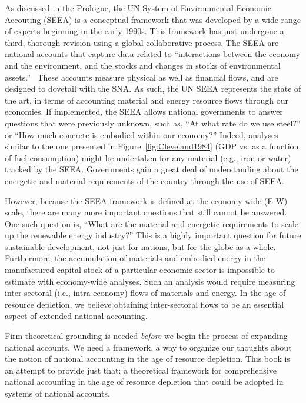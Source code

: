 %

As discussed in the Prologue, 
the UN System of Environmental-Economic Accouting (SEEA) 
is a conceptual framework 
that was developed by a wide range of experts 
beginning in the early 1990s. 
This framework has just undergone a third, 
thorough revision using a global collaborative process.
The SEEA are national accounts that
capture data related to ``interactions between the
economy and the environment, and the stocks
and changes in stocks of environmental assets.''~\cite[p. 1]{ UNSEEA2014}
These accounts measure physical as well as financial flows, and are
designed to dovetail with the SNA.
As such, the UN SEEA represents the state of the art,
in terms of accounting material and energy resource flows
through our economies.
If implemented, the SEEA allows national governments to answer questions
that were previously unknown,
such as, 
``At what rate do we use steel?'' or
``How much concrete is embodied within our economy?''
Indeed, analyses similar to the one presented in Figure~\ref{fig:Cleveland1984} 
(GDP vs. as a function of fuel consumption)
might be undertaken for any material (e.g., iron or water)
tracked by the SEEA.
Governments gain a great deal of understanding about the energetic
and material requirements of the country through the use of SEEA.

However, because the SEEA framework is defined at the economy-wide (E-W) scale,
there are many more important questions that still cannot be answered.
One such question is,
``What are the material and energetic requirements to scale up the renewable energy industry?''
This is a highly important question for future sustainable development,
not just for nations,
but for the globe as a whole.
Furthermore, the accumulation of materials and embodied energy
in the manufactured capital stock
of a particular economic sector is impossible to estimate with economy-wide analyses.
Such an analysis would require measuring inter-sectoral (i.e., intra-economy)
flows of materials and energy.
In the age of resource depletion, 
we believe obtaining inter-sectoral flows to be an essential
aspect of extended national accounting.

Firm theoretical grounding is needed 
\emph{before} we begin the process of expanding national accounts.
We need a framework, a way to organize our thoughts about the notion 
of national accounting in the age of resource depletion.
This book is an attempt to provide just that: 
a theoretical framework
for comprehensive national accounting
in the age of resource depletion
that could be adopted in systems of national accounts.

